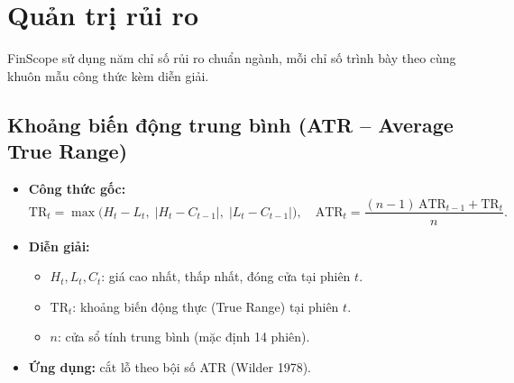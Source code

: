 \documentclass[12pt,a4paper,openany,oneside]{report}
\numberwithin{equation}{chapter}
\begin{document}
\section{Quản trị rủi ro}

\indent FinScope sử dụng năm chỉ số rủi ro chuẩn ngành, mỗi chỉ số
trình bày theo cùng khuôn mẫu công thức kèm diễn giải.

\subsection{Khoảng biến động trung bình (ATR -- Average True Range)}
\begin{itemize}[leftmargin=18pt,topsep=2pt,itemsep=3pt]
  \item \textbf{Công thức gốc:}
        \begin{equation}
          \mathrm{TR}_t = \max\!\bigl(H_t - L_t,\; |H_t - C_{t-1}|,\;
                                       |L_t - C_{t-1}|\bigr),\quad
          \mathrm{ATR}_t = \frac{(n-1)\,\mathrm{ATR}_{t-1} + \mathrm{TR}_t}{n}.
          \label{eq:atr}
        \end{equation}
  \item \textbf{Diễn giải:}
        \begin{itemize}[leftmargin=14pt,topsep=2pt,itemsep=1pt]
          \item $H_t, L_t, C_t$: giá cao nhất, thấp nhất, đóng cửa tại phiên $t$.
          \item $\mathrm{TR}_t$: khoảng biến động thực (True Range) tại phiên $t$.
          \item $n$: cửa sổ tính trung bình (mặc định 14 phiên).
        \end{itemize}
  \item \textbf{Ứng dụng:} cắt lỗ theo bội số ATR (Wilder 1978).
\end{itemize}
\end{document}
